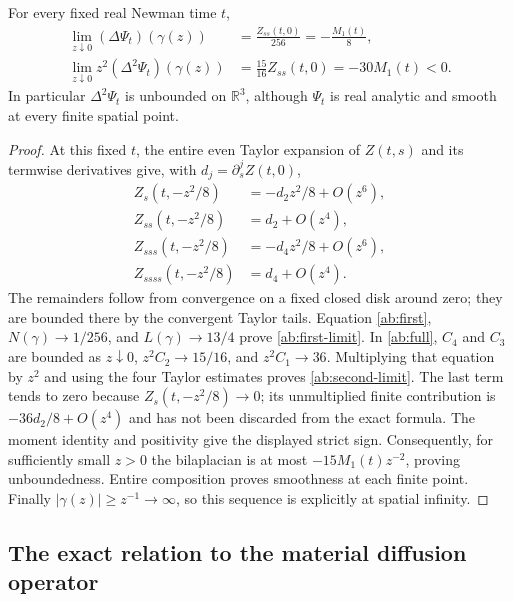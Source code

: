 \begin{proposition}
For every fixed real Newman time $t$,
\begin{align}
 \lim_{z\downarrow0}(\Delta\Psi_t)(\gamma(z))
    &=\frac{Z_{ss}(t,0)}{256}
      =-\frac{M_1(t)}8,\label{ab:first-limit}\\
 \lim_{z\downarrow0}z^2(\Delta^2\Psi_t)(\gamma(z))
    &=\frac{15}{16}Z_{ss}(t,0)
      =-30M_1(t)<0.\label{ab:second-limit}
\end{align}
In particular $\Delta^2\Psi_t$ is unbounded on $\mathbb R^3$,
although $\Psi_t$ is real analytic and smooth at every finite
spatial point.
\end{proposition}
\begin{proof}
At this fixed $t$, the entire even Taylor expansion of $Z(t,s)$
and its termwise derivatives give, with $d_j=\partial_s^jZ(t,0)$,
\begin{align*}
 Z_s(t,-z^2/8)&=-d_2z^2/8+O(z^6),\\
 Z_{ss}(t,-z^2/8)&=d_2+O(z^4),\\
 Z_{sss}(t,-z^2/8)&=-d_4z^2/8+O(z^6),\\
 Z_{ssss}(t,-z^2/8)&=d_4+O(z^4).
\end{align*}
The remainders follow from convergence on a fixed closed disk around
zero; they are bounded there by the convergent Taylor tails.
Equation \eqref{ab:first}, $N(\gamma)\to1/256$, and
$L(\gamma)\to13/4$ prove \eqref{ab:first-limit}.
In \eqref{ab:full}, $C_4$ and $C_3$ are bounded as $z\downarrow0$,
$z^2C_2\to15/16$, and $z^2C_1\to36$.
Multiplying that equation by $z^2$ and using the four Taylor estimates
proves \eqref{ab:second-limit}. The last term tends to zero because
$Z_s(t,-z^2/8)\to0$; its unmultiplied finite contribution is
$-36d_2/8+O(z^4)$ and has not been discarded from the exact formula.
The moment identity and positivity give the displayed strict sign.
Consequently, for sufficiently small $z>0$ the bilaplacian is at most
$-15M_1(t)z^{-2}$, proving unboundedness. Entire composition proves
smoothness at each finite point. Finally
$|\gamma(z)|\ge z^{-1}\to\infty$, so this sequence is explicitly
at spatial infinity.
\end{proof}

\subsection{The exact relation to the material diffusion operator}

